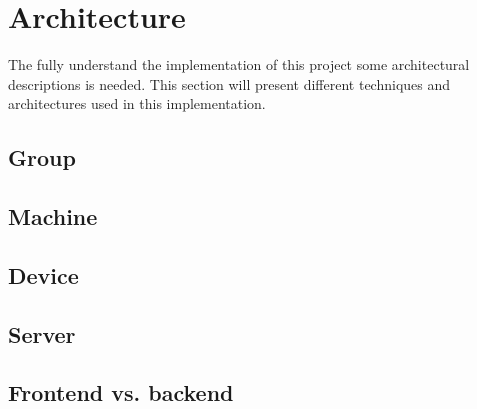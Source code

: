 \section{Architecture}\label{sec:implArchitecture}
The fully understand the implementation of this project some architectural descriptions is needed.
This section will present different techniques and architectures used in this implementation.

\subsection{Group}\label{sec:implArchitectureGroup}

\subsection{Machine}\label{sec:implArchitectureMachine}
\subsection{Device}\label{sec:implArchitectureDevice}
\subsection{Server}\label{sec:implArchitectureServer}
\subsection{Frontend vs. backend}\label{sec:implArchitectureFrontBack}

